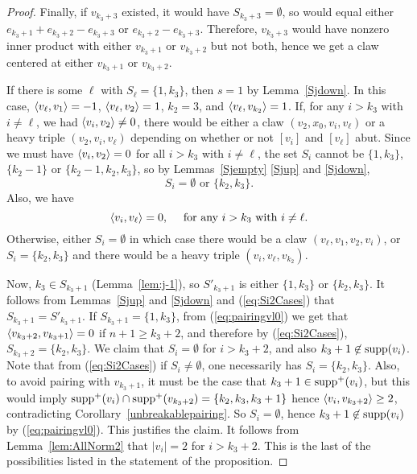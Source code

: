 \begin{proof}
Finally, if $v_{k_3 + 3}$ existed, it would have $S_{k_3 + 3} = \emptyset$, so would equal either $e_{k_3 + 1} + e_{k_3 + 2} - e_{k_3 + 3}$ or $e_{k_3 + 2} - e_{k_3 + 3}$. Therefore, $v_{k_3 + 3}$ would have nonzero inner product with either $v_{k_3 + 1}$ or $v_{k_3 + 2}$ but not both, hence we get a claw centered at either $v_{k_3 + 1}$ or $v_{k_3 + 2}$. 

If there is some $\ell$ with $S_\ell = \{1,k_3\}$, then $s = 1$ by Lemma~\ref{Sjdown}. In this case, $\left\langle v_\ell , v_1 \right\rangle = -1$, $\left\langle v_\ell , v_2 \right\rangle = 1$, $k_2=3$, and $\left\langle v_\ell , v_{k_2} \right\rangle = 1$. If, for any $ i > k_3$ with $i \neq \ell$, we had $\left\langle v_i , v_2 \right\rangle \neq 0$, there would be either a claw $(v_2,x_0,v_i,v_\ell)$ or a heavy triple $(v_2,v_i,v_\ell)$ depending on whether or not $[v_i]$ and $[v_\ell]$ abut. Since we must have $\left\langle v_i , v_2 \right\rangle=0$ for all $i > k_3$ with $i \neq \ell$, the set $S_i$ cannot be $\{1,k_3\}$, $\{ k_{2}-1\}$ or $\{ k_2-1, k_2, k_3\}$, so by Lemmas~\ref{Sjempty} \ref{Sjup} and \ref{Sjdown}, 
\begin{equation}\label{eq:Si2Cases}
S_i=\emptyset\text{ or }\{k_2,k_3\}.
\end{equation}
Also,  we have 
\begin{equation}\label{eq:pairingvl0}
\left\langle v_i , v_\ell \right\rangle = 0,\quad \text{ for any $i > k_3$ with $i \neq \ell$}.
\end{equation}
 Otherwise, either $S_i = \emptyset$ in which case there would be a claw $(v_\ell, v_1, v_2, v_i)$, or $S_i = \{k_2,k_3\}$ and there would be a heavy triple $(v_i, v_\ell, v_{k_2})$. 

Now, $k_3 \in S_{k_3 + 1}$ (Lemma~\ref{lem:j-1}), so $S'_{k_3 + 1}$ is either $\{1,k_3\}$ or $\{k_2,k_3\}$. 
It follows from Lemmas~\ref{Sjup} and \ref{Sjdown} and (\ref{eq:Si2Cases}) that $S_{k_3 + 1}=S'_{k_3 + 1}$. If $S_{k_3 + 1} = \{1,k_3\}$, from (\ref{eq:pairingvl0}) we get that $\left\langle v_{k_3+2} , v_{k_3+1} \right\rangle = 0$ if $n+1\ge k_3+2$, and therefore by (\ref{eq:Si2Cases}), $S_{k_3+2} = \{k_2,k_3\}$. We claim that $S_i = \emptyset$ for $i > k_3 + 2$, and also $k_3 + 1 \not \in \operatorname{supp}(v_i)$. Note that from (\ref{eq:Si2Cases}) if $S_i \not = \emptyset$, one necessarily has $S_i = \{ k_2, k_3\}$. Also, to avoid pairing with $v_{k_3+1}$, it must be the case that $k_3+1 \in \operatorname{supp}^+(v_i)$, but this would imply $\operatorname{supp}^+(v_i)\cap\operatorname{supp}^+(v_{k_3+2})=\{k_2,k_3,k_3+1\}$ hence $\left\langle v_i , v_{k_3+2} \right\rangle\ge2$, contradicting Corollary~\ref{unbreakablepairing}. So $S_i=\emptyset$, hence $k_3 + 1 \not \in \operatorname{supp}(v_i)$ by (\ref{eq:pairingvl0}). This justifies the claim. It follows from Lemma~\ref{lem:AllNorm2} that $|v_i| = 2$ for $i > k_3 + 2$. This is the last of the possibilities listed in the statement of the proposition.


\end{proof}
